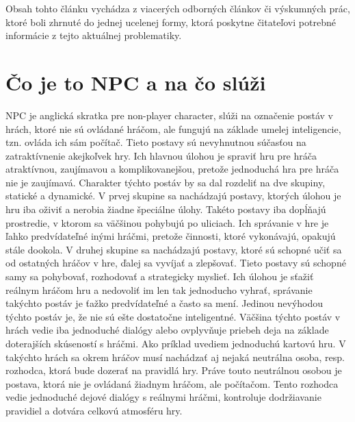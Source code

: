 \documentclass[10pt,twoside,slovak,a4paper]{article}
\begin{document}
Obsah tohto článku vychádza z viacerých odborných článkov či výskumných prác, ktoré boli zhrnuté do jednej ucelenej formy, ktorá poskytne čitateľovi potrebné informácie z tejto aktuálnej problematiky. 

\section{Čo je to NPC a na čo slúži}  \label{nejaka}
\quad NPC je anglická skratka pre non-player character, slúži na označenie postáv v hrách, ktoré nie sú ovládané hráčom, ale fungujú na základe umelej inteligencie, tzn. ovláda ich sám počítač. Tieto postavy sú nevyhnutnou súčasťou na zatraktívnenie akejkoľvek hry. Ich hlavnou úlohou je spraviť hru pre hráča atraktívnou, zaujímavou a komplikovanejšou, pretože jednoduchá hra pre hráča nie je zaujímavá. Charakter týchto postáv by sa dal rozdeliť na dve skupiny, statické a dynamické. V prvej skupine sa nachádzajú postavy, ktorých úlohou je hru iba oživiť a nerobia žiadne špeciálne úlohy. Takéto postavy iba dopĺňajú prostredie, v ktorom sa väčšinou pohybujú po uliciach. Ich správanie v hre je ľahko predvídateľné inými hráčmi, pretože činnosti, ktoré vykonávajú, opakujú stále dookola. V druhej skupine sa nachádzajú postavy, ktoré sú schopné učiť sa od ostatných hráčov v hre, ďalej sa vyvíjať a zlepšovať. Tieto postavy sú schopné samy sa pohybovať, rozhodovať a strategicky myslieť. Ich úlohou je sťažiť reálnym hráčom hru a nedovoliť im len tak jednoducho vyhrať, správanie takýchto postáv je ťažko predvídateľné a často sa mení. Jedinou nevýhodou týchto postáv je, že nie sú ešte dostatočne inteligentné. Väčšina týchto postáv v hrách vedie iba jednoduché dialógy alebo ovplyvňuje priebeh deja na základe doterajších skúseností s hráčmi. Ako príklad uvediem jednoduchú kartovú hru. V takýchto hrách sa okrem hráčov musí nachádzať aj nejaká neutrálna osoba, resp. rozhodca, ktorá bude dozerať na pravidlá hry. Práve touto neutrálnou osobou je postava, ktorá nie je ovládaná žiadnym hráčom, ale počítačom. Tento rozhodca vedie jednoduché dejové dialógy s reálnymi hráčmi, kontroluje dodržiavanie pravidiel a dotvára celkovú atmosféru hry. ~\cite{NPC, AI} 
\begin{figure*}[tbh]
\centering
\end{figure*}
\end{document}
